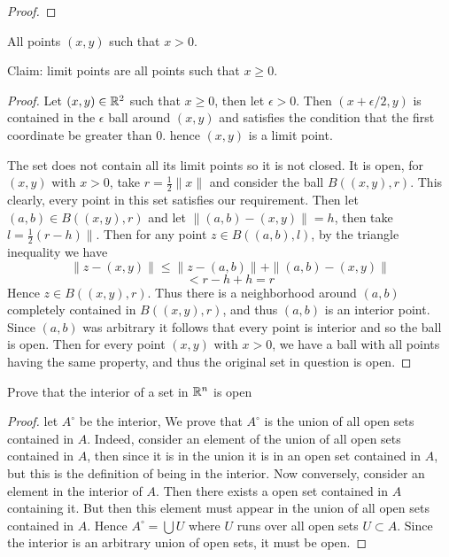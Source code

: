 \begin{alphaparts}
\begin{proof}
         \end{proof}

        \questionpart 
        All points $(x, y)$ such that $x > 0$. 

        Claim: limit points are all points such that $x \geq 0$. 

        \begin{proof}
            Let $(x, y) \in \mathbb{R}^2$ such that $x \geq 0$, then let $\epsilon > 0$. 
            Then $(x + \epsilon/2, y)$ is contained in the $\epsilon$ ball around 
            $(x, y)$ and satisfies the condition that the first coordinate be greater than $0$. 
            hence $(x, y)$ is a limit point. 


            The set does not contain all its limit points so it is not closed. 
            It is open, for $(x, y)$ with $x > 0$, take $r = \frac{1}{2} \| x \|$ and 
            consider the ball $B((x, y), r)$. This clearly, every point in this set satisfies 
            our requirement. Then let $(a, b) \in B((x, y), r)$ and let $\| (a, b) - (x, y) \| = h$, then take $l = \frac{1}{2}(r - h) \|$. 
            Then for any point $z \in B((a, b), l)$, by the triangle inequality we have 
            \[ \|z - (x, y) \| \leq \|z - (a, b) \| + \| (a, b) - (x, y) \| \]
            \[ < r - h + h = r\]
            Hence $z \in B((x, y), r)$. Thus there is a  neighborhood around $(a, b)$ completely contained in $B((x, y), r)$, and thus $(a, b)$ is an interior 
            point. Since $(a, b)$ was arbitrary it follows that every point is interior and so the ball is open. Then for every point $(x, y)$ with $x > 0$, 
            we have a ball with all points having the same property, and thus the original set in question is open.
        \end{proof}
    \end{alphaparts}


    \question 
    Prove that the interior of a set in $\mathbb{R}^n$ is open 

    \begin{proof}
        let $A^\circ $ be the interior, We prove that $A^\circ$ is the union of all open sets contained in $A$. Indeed, consider an element of the union of 
        all open sets contained in $A$, then since it is in the union it is in an open set contained in $A$, but this is the definition of being in the interior. 
        Now conversely, consider an element in the interior of $A$. Then there exists a open set contained in $A$ containing it. But then 
        this element must appear in the union of all open sets contained in $A$. Hence $A^\circ = \bigcup U$ where $U$ runs over all open sets $U \subset A$. 
        Since the interior is an arbitrary union of open sets, it must be open.  
    \end{proof}


